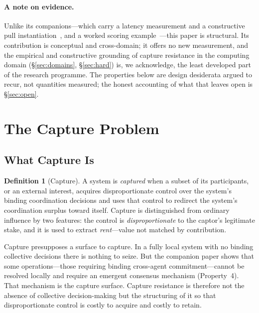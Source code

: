 \documentclass[11pt]{article}
\theoremstyle{definition}
\newtheorem{definition}{Definition}
\theoremstyle{plain}
\begin{document}
\paragraph{A note on evidence.} Unlike its companions---which carry a latency
measurement and a constructive pull instantiation~\cite{nicholson2026hlks}, and a
worked scoring example~\cite{nicholson2025}---this paper is structural. Its
contribution is conceptual and cross-domain; it offers no new measurement, and the
empirical and constructive grounding of capture resistance in the computing domain
(\S\ref{sec:domains}, \S\ref{sec:hard}) is, we acknowledge, the least developed part
of the research programme. The properties below are design desiderata argued to
recur, not quantities measured; the honest accounting of what that leaves open is
\S\ref{sec:open}.

\section{The Capture Problem}
\label{sec:problem}

\subsection{What Capture Is}

\begin{definition}[Capture]
A system is \emph{captured} when a subset of its participants, or an external
interest, acquires disproportionate control over the system's binding coordination
decisions and uses that control to redirect the system's coordination surplus
toward itself. Capture is distinguished from ordinary influence by two features:
the control is \emph{disproportionate} to the captor's legitimate stake, and it
is used to extract \emph{rent}---value not matched by contribution.
\end{definition}

Capture presupposes a surface to capture. In a fully local system with no binding
collective decisions there is nothing to seize. But the companion paper shows that
some operations---those requiring binding cross-agent commitment---cannot be
resolved locally and require an emergent consensus mechanism (Property~4). That
mechanism is the capture surface. Capture resistance is therefore not the absence
of collective decision-making but the structuring of it so that disproportionate
control is costly to acquire and costly to retain.
\end{document}
